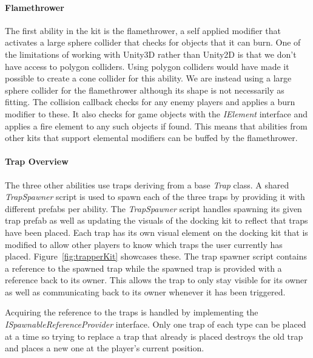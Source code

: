 \paragraph{Flamethrower}
The first ability in the kit is the flamethrower, a self applied modifier that activates a large sphere collider that checks for objects that it can burn. One of the limitations of working with Unity3D rather than Unity2D is that we don't have access to polygon colliders. Using polygon colliders would have made it possible to create a cone collider for this ability. We are instead using a large sphere collider for the flamethrower although its shape is not necessarily as fitting.
The collision callback checks for any enemy players and applies a burn modifier to these. It also checks for game objects with the \emph{IElement} interface and applies a fire element to any such objects if found. This means that abilities from other kits that support elemental modifiers can be buffed by the flamethrower.

\paragraph{Trap Overview}
The three other abilities use traps deriving from a base \emph{Trap} class. A shared \emph{TrapSpawner} script is used to spawn each of the three traps by providing it with different prefabs per ability. 
The \emph{TrapSpawner} script handles spawning its given trap prefab as well as updating the visuals of the docking kit to reflect that traps have been placed. Each trap has its own visual element on the docking kit that is modified to allow other players to know which traps the user currently has placed. Figure~\ref{fig:trapperKit} showcases these.
The trap spawner script contains a reference to the spawned trap while the spawned trap is provided with a reference back to its owner. This allows the trap to only stay visible for its owner as well as communicating back to its owner whenever it has been triggered. 

Acquiring the reference to the traps is handled by implementing the \emph{ISpawnableReferenceProvider} interface. Only one trap of each type can be placed at a time so trying to replace a trap that already is placed destroys the old trap and places a new one at the player's current position.  

